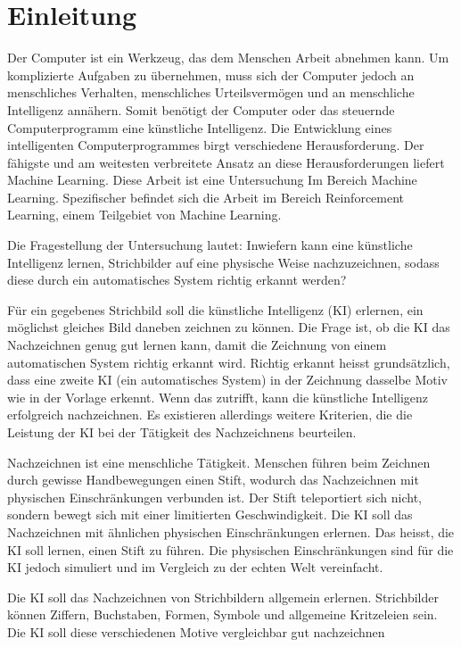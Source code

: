 
\chapter{Einleitung}\label{chap:einleit} Der Computer ist ein Werkzeug, das dem
Menschen Arbeit abnehmen kann. Um komplizierte Aufgaben zu übernehmen, muss sich
der Computer jedoch an menschliches Verhalten, menschliches Urteilsvermögen und
an menschliche Intelligenz annähern. Somit benötigt der Computer oder das
steuernde Computerprogramm eine künstliche Intelligenz. Die Entwicklung eines
intelligenten Computerprogrammes birgt verschiedene Herausforderung. Der
fähigste und am weitesten verbreitete Ansatz an diese Herausforderungen liefert
Machine Learning. Diese Arbeit ist eine Untersuchung Im Bereich Machine
Learning. Spezifischer befindet sich die Arbeit im Bereich Reinforcement
Learning, einem Teilgebiet von Machine Learning.
 
Die Fragestellung der Untersuchung lautet: Inwiefern kann eine künstliche
Intelligenz lernen, Strichbilder auf eine physische Weise nachzuzeichnen, sodass
diese durch ein automatisches System richtig erkannt werden?
 
Für ein gegebenes Strichbild soll die künstliche Intelligenz (KI) erlernen, ein
möglichst gleiches Bild daneben zeichnen zu können. Die Frage ist, ob die KI das
Nachzeichnen genug gut lernen kann, damit die Zeichnung von einem automatischen
System richtig erkannt wird. Richtig erkannt heisst grundsätzlich, dass eine
zweite KI (ein automatisches System) in der Zeichnung dasselbe Motiv wie in der
Vorlage erkennt. Wenn das zutrifft, kann die künstliche Intelligenz erfolgreich
nachzeichnen. Es existieren allerdings weitere Kriterien, die die Leistung der
KI bei der Tätigkeit des Nachzeichnens beurteilen.
 
Nachzeichnen ist eine menschliche Tätigkeit. Menschen führen beim Zeichnen durch
gewisse Handbewegungen einen Stift, wodurch das Nachzeichnen mit physischen
Einschränkungen verbunden ist. Der Stift teleportiert sich nicht, sondern bewegt
sich mit einer limitierten Geschwindigkeit. Die KI soll das Nachzeichnen mit
ähnlichen physischen Einschränkungen erlernen. Das heisst, die KI soll lernen,
einen Stift zu führen. Die physischen Einschränkungen sind für die KI jedoch
simuliert und im Vergleich zu der echten Welt vereinfacht.
 
Die KI soll das Nachzeichnen von Strichbildern allgemein erlernen. Strichbilder
können Ziffern, Buchstaben, Formen, Symbole und allgemeine Kritzeleien sein. Die
KI soll diese verschiedenen Motive vergleichbar gut nachzeichnen


